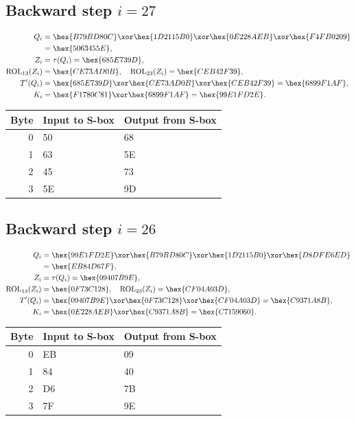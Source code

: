 \subsection*{Backward step $i=27$}
\begin{align*}
Q_i&=\hex{B79BD80C}\xor\hex{1D2115B0}\xor\hex{0E228AEB}\xor\hex{F4FB0209}\\&=\hex{5063455E},\\
Z_i&=\tau(Q_i)=\hex{685E739D},\\
\operatorname{ROL}_{13}(Z_i)&=\hex{CE73AD0B},\quad\operatorname{ROL}_{23}(Z_i)=\hex{CEB42F39},\\
T'(Q_i)&=\hex{685E739D}\xor\hex{CE73AD0B}\xor\hex{CEB42F39}=\hex{6899F1AF},\\
K_i&=\hex{F1780C81}\xor\hex{6899F1AF}=\hex{99E1FD2E}.\end{align*}
\begingroup\small
\begin{longtable}{rll}
\toprule
Byte & Input to S-box & Output from S-box\\\midrule
\endhead
0 & 50 & 68\\
1 & 63 & 5E\\
2 & 45 & 73\\
3 & 5E & 9D\\
\bottomrule\end{longtable}
\endgroup
\subsection*{Backward step $i=26$}
\begin{align*}
Q_i&=\hex{99E1FD2E}\xor\hex{B79BD80C}\xor\hex{1D2115B0}\xor\hex{D8DFE6ED}\\&=\hex{EB84D67F},\\
Z_i&=\tau(Q_i)=\hex{09407B9E},\\
\operatorname{ROL}_{13}(Z_i)&=\hex{0F73C128},\quad\operatorname{ROL}_{23}(Z_i)=\hex{CF04A03D},\\
T'(Q_i)&=\hex{09407B9E}\xor\hex{0F73C128}\xor\hex{CF04A03D}=\hex{C9371A8B},\\
K_i&=\hex{0E228AEB}\xor\hex{C9371A8B}=\hex{C7159060}.\end{align*}
\begingroup\small
\begin{longtable}{rll}
\toprule
Byte & Input to S-box & Output from S-box\\\midrule
\endhead
0 & EB & 09\\
1 & 84 & 40\\
2 & D6 & 7B\\
3 & 7F & 9E\\
\bottomrule\end{longtable}
\endgroup
